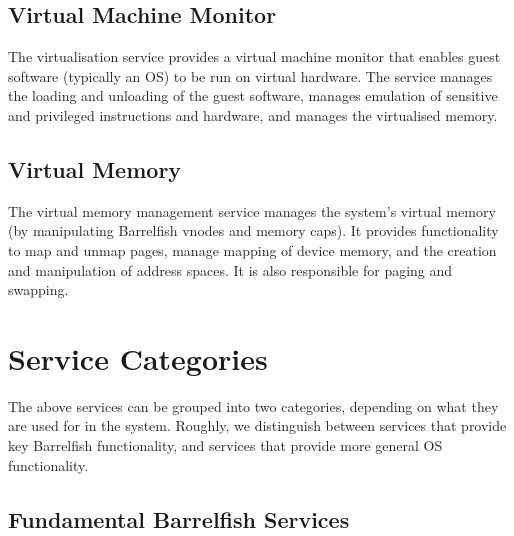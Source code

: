 \documentclass[a4paper,twoside]{report} %
\begin{document}
\subsection{Virtual Machine Monitor}


The virtualisation service provides a virtual machine monitor that
enables guest software (typically an OS) to be run on virtual hardware.
The service manages the loading and unloading of the guest software,
manages emulation of sensitive and privileged instructions and
hardware, and manages the virtualised memory.

\subsection{Virtual Memory}


The virtual memory management service manages the system's virtual
memory (by manipulating Barrelfish vnodes and memory caps).  It
provides functionality to map and unmap pages, manage mapping of
device memory, and the creation and manipulation of address spaces.
It is also responsible for paging and swapping.
	

\section{Service Categories}\label{sec:categories}


The above services can be grouped into two categories, depending on
what they are used for in the system.  Roughly, we distinguish between
services that provide key Barrelfish functionality, and services that
provide more general OS functionality.

\subsection{Fundamental Barrelfish Services}
\end{document}
